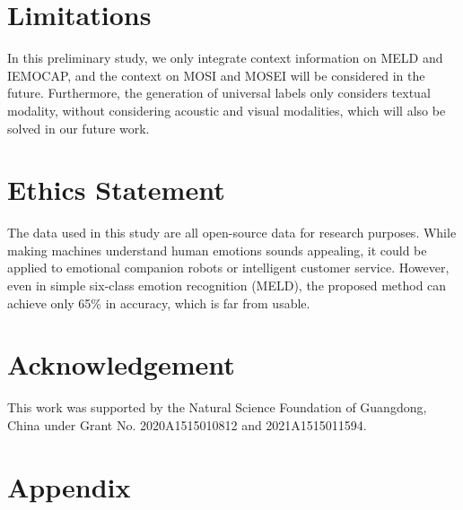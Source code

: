 \documentclass[11pt]{article}
\begin{document}
\section*{Limitations}
In this preliminary study, we only integrate context information on MELD and IEMOCAP, and the context on MOSI and MOSEI will be considered in the future. Furthermore, the generation of universal labels only considers textual modality, without considering acoustic and visual modalities, which will also be solved in our future work. 


\section*{Ethics Statement}
The data used in this study are all open-source data for research purposes. While making machines understand human emotions sounds appealing, it could be applied to emotional companion robots or intelligent customer service. However, even in simple six-class emotion recognition (MELD), the proposed method can achieve only 65\% in accuracy, which is far from usable.

\section*{Acknowledgement}
This work was supported by the Natural Science Foundation of Guangdong, China under Grant No. 2020A1515010812 and
2021A1515011594.



\newpage
\appendix

\section{Appendix}
\end{document}

